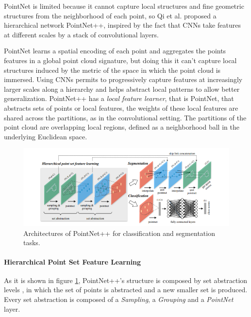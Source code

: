 PointNet is limited because it cannot capture local structures and fine geometric structures from the neighborhood of each point, so Qi et al. \cite{qi2017pointnet++} proposed a hierarchical network PointNet++, inspired by the fact that CNNs take features at different scales by a stack of convolutional layers.

PointNet learns a spatial encoding of each point and aggregates the points features in a global point cloud signature, but doing this it can't capture local structures induced by the metric of the space in which the point cloud is immersed. Using CNNs permits to progressively capture features at increasingly larger scales along a hierarchy and helps abstract local patterns to allow better generalization. PointNet++ has a \textit{local feature learner}, that is PointNet, that abstracts sets of points or local features, the weights of these local features are shared across the partitions, as in the convolutional setting. The partitions of the point cloud are overlapping local regions, defined as a neighborhood ball in the underlying Euclidean space.

\begin{figure}[ht]
    \centering
    \includegraphics[width=\textwidth]{images/pointnet++_architecture.png}
    \caption{Architectures of PointNet++ for classification and segmentation tasks.}
    \label{fig:pointnet++_architecture}
\end{figure}

\paragraph{Hierarchical Point Set Feature Learning}

As it is shown in figure \ref{fig:pointnet++_architecture}, PointNet++'s structure is composed by set abstraction levels , in which the set of points is abstracted and a new smaller set is produced. Every set abstraction is composed of a \textit{Sampling}, a \textit{Grouping} and a \textit{PointNet} layer.

